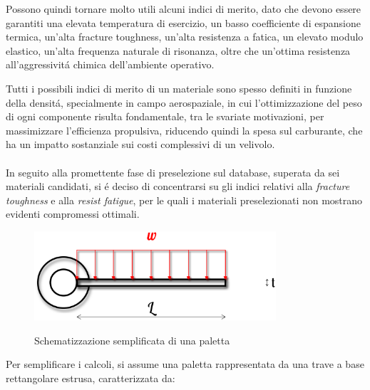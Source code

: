 \documentclass{article}
\begin{document}
        Possono quindi tornare molto utili alcuni indici di merito, dato che devono essere garantiti una elevata temperatura di esercizio, un basso coefficiente di espansione termica, un’alta fracture toughness, un’alta resistenza a fatica, un elevato modulo elastico, un’alta frequenza naturale di risonanza, oltre che un’ottima resistenza all’aggressivitá chimica dell’ambiente operativo. 
        
        Tutti i possibili indici di merito di un materiale sono spesso definiti in funzione della densitá, specialmente in campo aerospaziale, in cui l’ottimizzazione del peso di ogni componente risulta fondamentale, tra le svariate motivazioni, per massimizzare l’efficienza propulsiva, riducendo quindi la spesa sul carburante, che ha un impatto sostanziale sui costi complessivi di un velivolo.
        \\ \\ 
        In seguito alla promettente fase di preselezione sul database,
        superata da sei materiali candidati, si é deciso di concentrarsi su gli indici relativi alla \textit{fracture toughness} e alla \textit{resist fatigue},
        per le quali i materiali preselezionati non mostrano evidenti compromessi ottimali.

        \begin{figure}[h!]
            \centering
             \label{blade_load}
            \includegraphics[width=0.8\textwidth]{Sources/blade_load.eps}
            \caption{Schematizzazione semplificata di una paletta \autocite{Inkscape}}
        \end{figure}
        \clearpage

        Per semplificare i calcoli, si assume una paletta rappresentata da una trave a base rettangolare
        estrusa, caratterizzata da:
\end{document}
